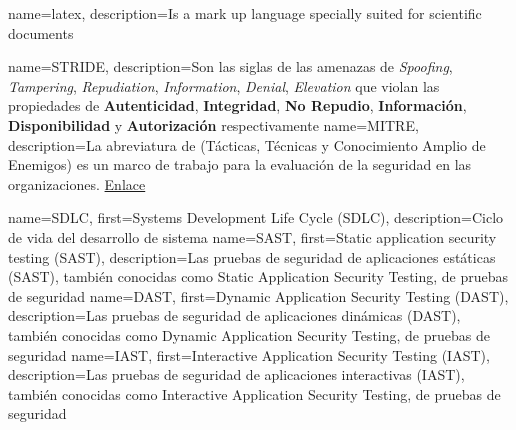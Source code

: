 \makeglossaries


    {name={latex},      description={Is a mark up language specially suited for scientific documents}}

   {name={STRIDE},     description={Son las siglas de las amenazas de \textit{Spoofing}, \textit{Tampering}, \textit{Repudiation}, \textit{Information}, \textit{Denial}, \textit{Elevation} que violan las propiedades de \textbf{Autenticidad}, \textbf{Integridad}, \textbf{No Repudio}, \textbf{Información}, \textbf{Disponibilidad} y \textbf{Autorización} respectivamente}}
    {name={MITRE},      description={La abreviatura de (Tácticas, Técnicas y Conocimiento Amplio de Enemigos) es un marco de trabajo para la evaluación de la seguridad en las organizaciones. \href{https://attack.mitre.org/}{Enlace}}}

     {name={SDLC},   first={Systems Development Life Cycle (SDLC)},           description={Ciclo de vida del desarrollo de sistema}}
     {name={SAST},   first={Static application security testing (SAST)},      description={Las pruebas de seguridad de aplicaciones estáticas (SAST), también conocidas como Static Application Security Testing, de pruebas de seguridad}}
     {name={DAST},   first={Dynamic Application Security Testing (DAST)},     description={Las pruebas de seguridad de aplicaciones dinámicas (DAST), también conocidas como Dynamic Application Security Testing, de pruebas de seguridad}}
     {name={IAST},   first={Interactive Application Security Testing (IAST)}, description={Las pruebas de seguridad de aplicaciones interactivas (IAST), también conocidas como Interactive Application Security Testing, de pruebas de seguridad}}


